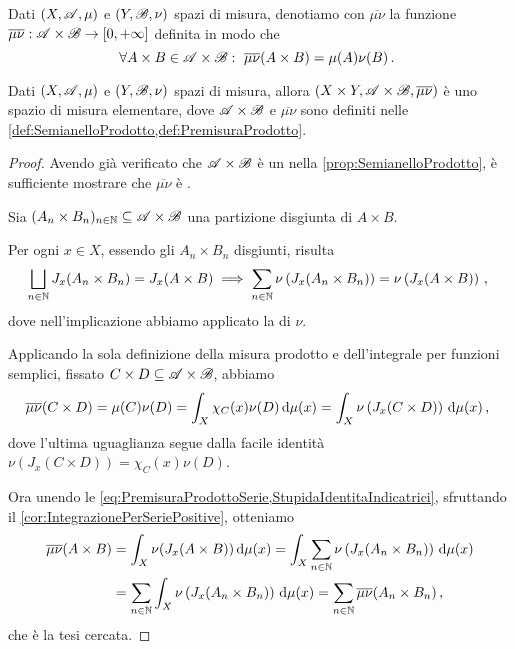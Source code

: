 \begin{definition}\label{def:PremisuraProdotto}
	Dati $(X,\mathscr A,\mu)$ e $(Y,\mathscr B,\nu)$ spazi di misura, denotiamo con $\overline{\mu\nu}$ la funzione $\overline{\mu\nu}:\mathscr A\times\mathscr B\to[0,+\infty]$ definita in modo che 
	\begin{equation*}
		\forall A\times B\in\mathscr A\times\mathscr B:\ \overline{\mu\nu}(A\times B)=\mu(A)\nu(B)\, \text{. }
	\end{equation*}
\end{definition}

\begin{theorem}\label{thm:PremisuraProdotto}
	Dati $(X,\mathscr A,\mu)$ e $(Y,\mathscr B,\nu)$ spazi di misura, allora $(X\times Y,\mathscr A\times\mathscr B,\overline{\mu\nu})$ è uno spazio di misura elementare, dove $\mathscr A\times\mathscr B$ e $\overline{\mu\nu}$ sono definiti nelle \cref{def:SemianelloProdotto,def:PremisuraProdotto}.
\end{theorem}
\begin{proof}
	Avendo già verificato che $\mathscr A\times\mathscr B$ è un \semiring{} nella \cref{prop:SemianelloProdotto}, è sufficiente mostrare che $\overline{\mu\nu}$ è \sigadd{}.
	
	Sia $(A_n\times B_n)_{n\in\mathbb N}\subseteq \mathscr A\times \mathscr B$ una partizione disgiunta di $A\times B$.
	
	Per ogni $x\in X$, essendo gli $A_n\times B_n$ disgiunti, risulta
	\begin{equation}\label{eq:PremisuraProdottoSerie}
		\bigsqcup_{n\in\mathbb N} J_x(A_n\times B_n) = J_x(A\times B)  \implies \sum_{n\in\mathbb N}\nu\left(J_x(A_n\times B_n)\right)=\nu\left(J_x(A\times B)\right)\, \text{, }
	\end{equation}
	dove nell'implicazione abbiamo applicato la \sigadd[ità] di $\nu$.
	
	Applicando la sola definizione della misura prodotto e dell'integrale per funzioni semplici, fissato $C\times D\subseteq \mathscr A\times\mathscr B$, abbiamo
	\begin{equation}\label{StupidaIdentitaIndicatrici}
		\overline{\mu\nu}(C\times D)=\mu(C)\nu(D)=\int_{X}\chi_C(x)\nu(D)\,\mathrm d \mu(x)=\int_X \nu\left(J_x(C\times D)\right)\,\mathrm d\mu(x)\, \text{, }
	\end{equation}
	dove l'ultima uguaglianza segue dalla facile identità $\nu\left(J_x(C\times D)\right)=\chi_C(x)\nu(D)$.
	
	Ora unendo le \cref{eq:PremisuraProdottoSerie,StupidaIdentitaIndicatrici}, sfruttando il \cref{cor:IntegrazionePerSeriePositive}, otteniamo
	\begin{align*}
		\overline{\mu\nu}(A\times B)&=\int_X\nu(J_x(A\times B))\,\mathrm d \mu(x)=\int_X\sum_{n\in\mathbb N}\nu\left(J_x(A_n\times B_n)\right)\,\mathrm d\mu(x)\\
		&=\sum_{n\in\mathbb N}\int_X\nu\left(J_x(A_n\times B_n)\right)\,\mathrm d\mu(x)=\sum_{n\in\mathbb N}\overline{\mu\nu}(A_n\times B_n)\, \text{, }
	\end{align*}
	che è la tesi cercata.
\end{proof}

